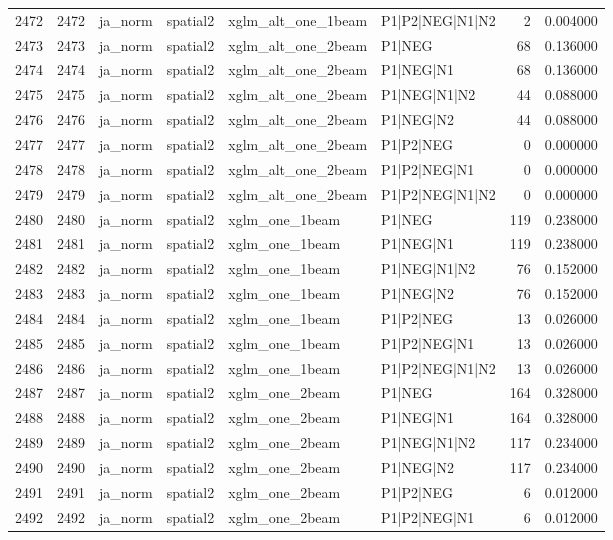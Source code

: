 \begin{tabular}{lrllllrr}
2472 & 2472 & ja_norm & spatial2 & xglm_alt_one_1beam & P1|P2|NEG|N1|N2 & 2 & 0.004000 \\
2473 & 2473 & ja_norm & spatial2 & xglm_alt_one_2beam & P1|NEG & 68 & 0.136000 \\
2474 & 2474 & ja_norm & spatial2 & xglm_alt_one_2beam & P1|NEG|N1 & 68 & 0.136000 \\
2475 & 2475 & ja_norm & spatial2 & xglm_alt_one_2beam & P1|NEG|N1|N2 & 44 & 0.088000 \\
2476 & 2476 & ja_norm & spatial2 & xglm_alt_one_2beam & P1|NEG|N2 & 44 & 0.088000 \\
2477 & 2477 & ja_norm & spatial2 & xglm_alt_one_2beam & P1|P2|NEG & 0 & 0.000000 \\
2478 & 2478 & ja_norm & spatial2 & xglm_alt_one_2beam & P1|P2|NEG|N1 & 0 & 0.000000 \\
2479 & 2479 & ja_norm & spatial2 & xglm_alt_one_2beam & P1|P2|NEG|N1|N2 & 0 & 0.000000 \\
2480 & 2480 & ja_norm & spatial2 & xglm_one_1beam & P1|NEG & 119 & 0.238000 \\
2481 & 2481 & ja_norm & spatial2 & xglm_one_1beam & P1|NEG|N1 & 119 & 0.238000 \\
2482 & 2482 & ja_norm & spatial2 & xglm_one_1beam & P1|NEG|N1|N2 & 76 & 0.152000 \\
2483 & 2483 & ja_norm & spatial2 & xglm_one_1beam & P1|NEG|N2 & 76 & 0.152000 \\
2484 & 2484 & ja_norm & spatial2 & xglm_one_1beam & P1|P2|NEG & 13 & 0.026000 \\
2485 & 2485 & ja_norm & spatial2 & xglm_one_1beam & P1|P2|NEG|N1 & 13 & 0.026000 \\
2486 & 2486 & ja_norm & spatial2 & xglm_one_1beam & P1|P2|NEG|N1|N2 & 13 & 0.026000 \\
2487 & 2487 & ja_norm & spatial2 & xglm_one_2beam & P1|NEG & 164 & 0.328000 \\
2488 & 2488 & ja_norm & spatial2 & xglm_one_2beam & P1|NEG|N1 & 164 & 0.328000 \\
2489 & 2489 & ja_norm & spatial2 & xglm_one_2beam & P1|NEG|N1|N2 & 117 & 0.234000 \\
2490 & 2490 & ja_norm & spatial2 & xglm_one_2beam & P1|NEG|N2 & 117 & 0.234000 \\
2491 & 2491 & ja_norm & spatial2 & xglm_one_2beam & P1|P2|NEG & 6 & 0.012000 \\
2492 & 2492 & ja_norm & spatial2 & xglm_one_2beam & P1|P2|NEG|N1 & 6 & 0.012000 \\

\end{tabular}
